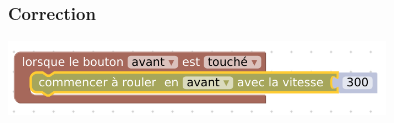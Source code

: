 \documentclass[svgnames,11pt]{beamer}
\begin{document}
\begin{frame}
    \frametitle{Correction}

    \begin{center}
    \centering
    \includegraphics[width=10cm]{ressources/cor3.png}
    \end{center}

\end{frame}
\end{document}
